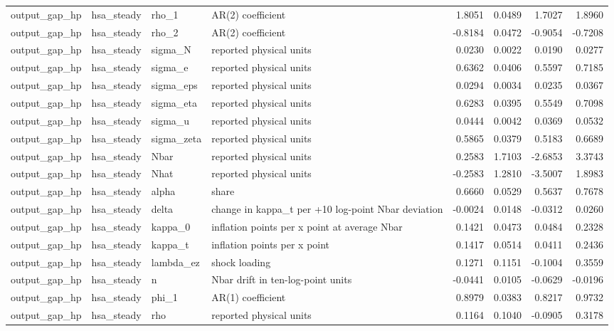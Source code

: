 \begin{tabular}{llllrrrr}
output\_gap\_hp & hsa\_steady & rho\_1 & AR(2) coefficient & 1.8051 & 0.0489 & 1.7027 & 1.8960 \\
output\_gap\_hp & hsa\_steady & rho\_2 & AR(2) coefficient & -0.8184 & 0.0472 & -0.9054 & -0.7208 \\
output\_gap\_hp & hsa\_steady & sigma\_N & reported physical units & 0.0230 & 0.0022 & 0.0190 & 0.0277 \\
output\_gap\_hp & hsa\_steady & sigma\_e & reported physical units & 0.6362 & 0.0406 & 0.5597 & 0.7185 \\
output\_gap\_hp & hsa\_steady & sigma\_eps & reported physical units & 0.0294 & 0.0034 & 0.0235 & 0.0367 \\
output\_gap\_hp & hsa\_steady & sigma\_eta & reported physical units & 0.6283 & 0.0395 & 0.5549 & 0.7098 \\
output\_gap\_hp & hsa\_steady & sigma\_u & reported physical units & 0.0444 & 0.0042 & 0.0369 & 0.0532 \\
output\_gap\_hp & hsa\_steady & sigma\_zeta & reported physical units & 0.5865 & 0.0379 & 0.5183 & 0.6689 \\
output\_gap\_hp & hsa\_steady & Nbar & reported physical units & 0.2583 & 1.7103 & -2.6853 & 3.3743 \\
output\_gap\_hp & hsa\_steady & Nhat & reported physical units & -0.2583 & 1.2810 & -3.5007 & 1.8983 \\
output\_gap\_hp & hsa\_steady & alpha & share & 0.6660 & 0.0529 & 0.5637 & 0.7678 \\
output\_gap\_hp & hsa\_steady & delta & change in kappa\_t per +10 log-point Nbar deviation & -0.0024 & 0.0148 & -0.0312 & 0.0260 \\
output\_gap\_hp & hsa\_steady & kappa\_0 & inflation points per x point at average Nbar & 0.1421 & 0.0473 & 0.0484 & 0.2328 \\
output\_gap\_hp & hsa\_steady & kappa\_t & inflation points per x point & 0.1417 & 0.0514 & 0.0411 & 0.2436 \\
output\_gap\_hp & hsa\_steady & lambda\_ez & shock loading & 0.1271 & 0.1151 & -0.1004 & 0.3559 \\
output\_gap\_hp & hsa\_steady & n & Nbar drift in ten-log-point units & -0.0441 & 0.0105 & -0.0629 & -0.0196 \\
output\_gap\_hp & hsa\_steady & phi\_1 & AR(1) coefficient & 0.8979 & 0.0383 & 0.8217 & 0.9732 \\
output\_gap\_hp & hsa\_steady & rho & reported physical units & 0.1164 & 0.1040 & -0.0905 & 0.3178 \\

\end{tabular}
